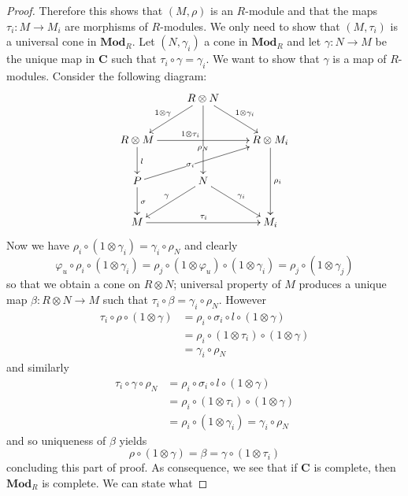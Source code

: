 \begin{refsection}
\begin{proof}
Therefore this shows that $(M,\rho)$ is an $R$-module and that the maps $\tau_i \colon M \to M_i$ are morphisms of $R$-modules. We only need to show that $(M,\tau_i)$ is a universal cone in $\mathbf{Mod}_R$. Let $(N,\gamma_i)$ a cone in $\mathbf{Mod}_R$ and let $\gamma \colon N \to M$ be the unique map in $\mathbf C$ such that $\tau_i \circ \gamma = \gamma_i$. We want to show that $\gamma$ is a map of $R$-modules. Consider the following diagram:
\begin{equation*}
\xymatrix { & R \otimes N \ar[dl]_{1 \otimes \gamma} \ar[dr]^{1 \otimes \gamma_i} \ar[dd]|(.6){\rho_N} \\ R \otimes M \ar[d]^l \ar[rr]^(.4){1 \otimes \tau_i} & & R \otimes M_i \ar[dd]^{\rho_i} \\ P \ar[d]^\sigma \ar[urr]|(.4){\sigma_i} & N \ar[dl]_\gamma \ar[dr]^{\gamma_i} \\ M \ar[rr]^{\tau_i} & & M_i }
\end{equation*}
Now we have $\rho_i \circ (1 \otimes \gamma_i) = \gamma_i \circ \rho_N$ and clearly
\begin{equation*}
\varphi_u \circ \rho_i \circ (1 \otimes \gamma_i) = \rho_j \circ (1 \otimes \varphi_u) \circ (1 \otimes \gamma_i) = \rho_j \circ (1 \otimes \gamma_j) \end{equation*}
so that we obtain a cone on $R \otimes N$; universal property of $M$ produces a unique map $\beta \colon R \otimes N \to M$ such that $\tau_i \circ \beta = \gamma_i \circ \rho_N$. However
\begin{align*}
\tau_i \circ \rho \circ (1 \otimes \gamma) & = \rho_i \circ \sigma_i \circ l \circ (1 \otimes \gamma) \\
& = \rho_i \circ (1 \otimes \tau_i) \circ (1 \otimes \gamma) \\
& = \gamma_i \circ \rho_N
\end{align*}
and similarly
\begin{align*}
\tau_i \circ \gamma \circ \rho_N & = \rho_i \circ \sigma_i \circ l \circ (1 \otimes \gamma) \\
& = \rho_i \circ (1 \otimes \tau_i) \circ (1 \otimes \gamma) \\
& = \rho_i \circ (1 \otimes \gamma_i) = \gamma_i \circ \rho_N
\end{align*}
and so uniqueness of $\beta$ yields
\begin{equation*}
\rho \circ (1 \otimes \gamma) = \beta = \gamma \circ (1 \otimes \tau_i)
\end{equation*}
concluding this part of proof. As consequence, we see that if $\mathbf C$ is complete, then $\mathbf{Mod}_R$ is complete. We can state what
\end{proof}


\end{refsection}
